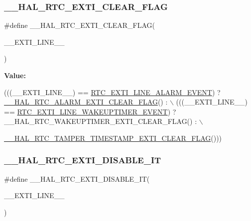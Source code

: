 \subsubsection{\texorpdfstring{\+\_\+\+\_\+\+H\+A\+L\+\_\+\+R\+T\+C\+\_\+\+E\+X\+T\+I\+\_\+\+C\+L\+E\+A\+R\+\_\+\+F\+L\+AG}{\_\_HAL\_RTC\_EXTI\_CLEAR\_FLAG}}
{\footnotesize\ttfamily \#define \+\_\+\+\_\+\+H\+A\+L\+\_\+\+R\+T\+C\+\_\+\+E\+X\+T\+I\+\_\+\+C\+L\+E\+A\+R\+\_\+\+F\+L\+AG(\begin{DoxyParamCaption}\item[{}]{\+\_\+\+\_\+\+E\+X\+T\+I\+\_\+\+L\+I\+N\+E\+\_\+\+\_\+ }\end{DoxyParamCaption})}

{\bfseries Value\+:}
\begin{DoxyCode}
(((\_\_EXTI\_LINE\_\_) == \hyperlink{group___r_t_c___private___constants_gaeffe9b89372b06df1c0eff2f4346682b}{RTC\_EXTI\_LINE\_ALARM\_EVENT}) ? 
      \hyperlink{group___r_t_c___exported___macros_ga7da963373beb744413c1e3302eb91bae}{\_\_HAL\_RTC\_ALARM\_EXTI\_CLEAR\_FLAG}() : \(\backslash\)
                                                   (((\_\_EXTI\_LINE\_\_) == 
      \hyperlink{group___r_t_c_ex___private___constants_ga1a1a58e244663850786c387bfa5474f2}{RTC\_EXTI\_LINE\_WAKEUPTIMER\_EVENT}) ? \_\_HAL\_RTC\_WAKEUPTIMER\_EXTI\_CLEAR\_FLAG() :
       \(\backslash\)
                                                      
      \hyperlink{group___r_t_c_ex___tamper___timestamp_gae09eceae702ba11106cd04f6ea43b06a}{\_\_HAL\_RTC\_TAMPER\_TIMESTAMP\_EXTI\_CLEAR\_FLAG}()))
\end{DoxyCode}
\mbox{\label{group___h_a_l___r_t_c___aliased___macros_ga9b18753e4b04bf550e36d81a6064ba36}} 
\subsubsection{\texorpdfstring{\+\_\+\+\_\+\+H\+A\+L\+\_\+\+R\+T\+C\+\_\+\+E\+X\+T\+I\+\_\+\+D\+I\+S\+A\+B\+L\+E\+\_\+\+IT}{\_\_HAL\_RTC\_EXTI\_DISABLE\_IT}}
{\footnotesize\ttfamily \#define \+\_\+\+\_\+\+H\+A\+L\+\_\+\+R\+T\+C\+\_\+\+E\+X\+T\+I\+\_\+\+D\+I\+S\+A\+B\+L\+E\+\_\+\+IT(\begin{DoxyParamCaption}\item[{}]{\+\_\+\+\_\+\+E\+X\+T\+I\+\_\+\+L\+I\+N\+E\+\_\+\+\_\+ }\end{DoxyParamCaption})}

